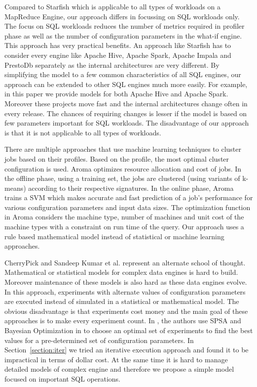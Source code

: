 Compared to Starfish which is applicable to all types of workloads on a MapReduce Engine, our approach differs in focussing on SQL workloads only. The focus on 
SQL workloads reduces the number of metrics required in profiler phase as well as the number of configuration parameters in the what-if engine.
This approach has very practical benefits. An approach like Starfish has to consider every engine like Apache Hive, Apache Spark, Apache Impala and PrestoDb separately
as the internal architectures are very different. By simplifying the model to a few common characteristics of all SQL engines, our approach can be extended
to other SQL engines much more easily. For example, in this paper we provide models for both Apache Hive and Apache Spark. Moreover these projects move 
fast and the internal architectures change often in every release. The chances of requiring changes is lesser if the model is based on few parameters important for SQL workloads.
The disadvantage of our approach is that it is not applicable to all types of workloads. 

There are multiple approaches \cite{wu2013self} \cite{lama2012aroma} that use machine learning techniques
to cluster jobs based on their profiles. Based on the profile, the most optimal cluster configuration is
used. Aroma \cite{lama2012aroma} optimizes resource allocation and cost of jobs. In
the offline phase, using a training set, the jobs are clustered
(using variants of k-means) according to their respective signatures.
In the online phase, Aroma trains a SVM which makes
accurate and fast prediction of a job's performance for various
configuration parameters and input data sizes. The optimization function in Aroma considers
the machine type, number of machines and unit cost of the machine types with a constraint on
run time of the query. Our approach uses a rule based mathematical model instead of statistical or machine learning approaches. 
 
CherryPick\cite{Li:2014:MMO:2600212.2600229} and Sandeep Kumar et al.\cite{KumarPLPGB16} represent an alternate school of thought.
Mathematical or statistical models for complex data engines is hard to build. Moreover maintenance of these models 
is also hard as these data engines evolve. In this approach, experiments
with alternate values of configuration parameters are executed instead of simulated in a 
statistical or mathematical model. The obvious disadvantage is that experiments cost money and the main 
goal of these approaches is to make every experiment count. In \cite{KumarPLPGB16}, the authors use SPSA and Bayesian Optimization in \cite{Li:2014:MMO:2600212.2600229} 
to choose an optimal set of experiments to find the best values for a pre-determined set of configuration parameters.
In Section~\ref{section:iter} we tried an iterative execution approach and found it to be impractical in terms of dollar cost. 
At the same time it is hard to manage detailed models of complex engine and therefore
we propose a simple model focused on important SQL operations.
  
